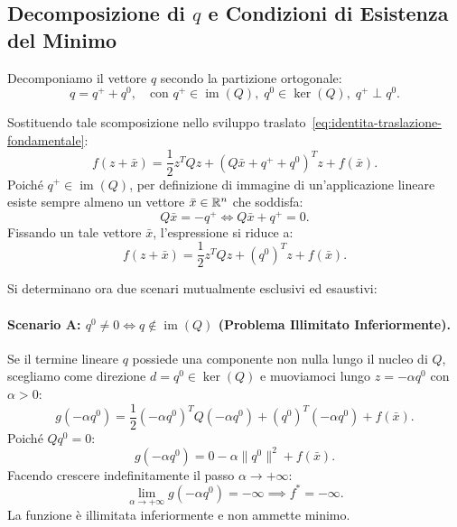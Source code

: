 \subsection{Decomposizione di \texorpdfstring{$q$}{q} e Condizioni di Esistenza del Minimo}
Decomponiamo il vettore $q$ secondo la partizione ortogonale:
\begin{equation}
    q = q^+ + q^0, \quad \text{con } q^+ \in \operatorname{im}(Q), \; q^0 \in \ker(Q), \; q^+ \perp q^0.
\end{equation}

Sostituendo tale scomposizione nello sviluppo traslato~\eqref{eq:identita-traslazione-fondamentale}:
\begin{equation}
    f(z + \bar{x}) = \frac{1}{2} z^T Q z + (Q \bar{x} + q^+ + q^0)^T z + f(\bar{x}).
\end{equation}
Poich\'e $q^+ \in \operatorname{im}(Q)$, per definizione di immagine di un'applicazione lineare esiste sempre almeno un vettore $\bar{x} \in \mathbb{R}^n$ che soddisfa:
\begin{equation}
    Q \bar{x} = -q^+ \iff Q \bar{x} + q^+ = 0.
\end{equation}
Fissando un tale vettore $\bar{x}$, l'espressione si riduce a:
\begin{equation}
    f(z + \bar{x}) = \frac{1}{2} z^T Q z + (q^0)^T z + f(\bar{x}).
    \label{eq:ridotta-singolare}
\end{equation}

Si determinano ora due scenari mutualmente esclusivi ed esaustivi:

\paragraph{Scenario A: $q^0 \neq 0 \iff q \notin \operatorname{im}(Q)$ (Problema Illimitato Inferiormente).}
Se il termine lineare $q$ possiede una componente non nulla lungo il nucleo di $Q$, scegliamo come direzione $d = q^0 \in \ker(Q)$ e muoviamoci lungo $z = -\alpha q^0$ con $\alpha > 0$:
\begin{equation}
    g(-\alpha q^0) = \frac{1}{2} (-\alpha q^0)^T Q (-\alpha q^0) + (q^0)^T (-\alpha q^0) + f(\bar{x}).
\end{equation}
Poich\'e $Q q^0 = 0$:
\begin{equation}
    g(-\alpha q^0) = 0 - \alpha \|q^0\|^2 + f(\bar{x}).
\end{equation}
Facendo crescere indefinitamente il passo $\alpha \to +\infty$:
\begin{equation}
    \lim_{\alpha \to +\infty} g(-\alpha q^0) = -\infty \implies f^* = -\infty.
\end{equation}
La funzione \`e illimitata inferiormente e non ammette minimo.

